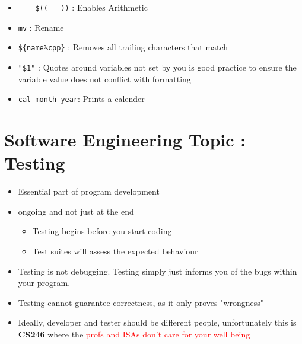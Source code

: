 \documentclass{article}
\newenvironment{ablock}[1]{%
    \tcolorbox[beamer,%
    noparskip,breakable,
    colback=lightcoral,colframe=darkred,%
    colbacklower=tomato!75!lightcoral,%
    title=#1]}%
    {\endtcolorbox}
\begin{document}
\begin{ablock}{Notable Commands and Practices}
\begin{itemize}
\item \verb|___ $((___))| : Enables Arithmetic 
\item \verb|mv| : Rename
\item \verb|${name%cpp}| : Removes all trailing characters that match
\item \verb|"$1"| : Quotes around variables not set by you is good practice to ensure the variable value does not conflict with formatting 
\item \verb|cal month year|: Prints a calender 
\end{itemize}
\end{ablock}

\section{Software Engineering Topic : Testing}
\begin{itemize}
\item Essential part of program development 
\item ongoing and not just at the end 
\begin{itemize}
\item Testing begins before you start coding 
\item Test suites will assess the expected behaviour 
\end{itemize}
\item Testing is not debugging. Testing simply just informs you of the bugs within your program.
\item Testing cannot guarantee correctness, as it only proves "wrongness"
\item Ideally, developer and tester should be different people, unfortunately this is \textbf{CS246} where the \textcolor{red}{profs and ISAs don't care for your well being}
\end{itemize}
\end{document}
